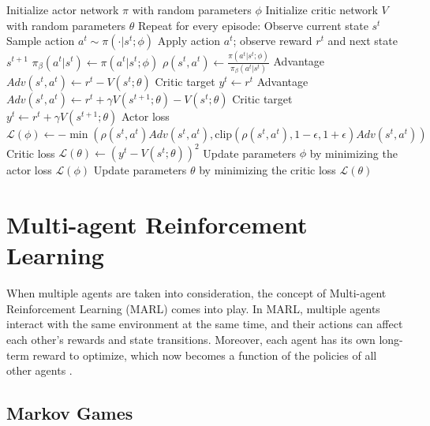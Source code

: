\begin{algorithm}[t]
\caption{PPO}
\label{alg:ppo}
\begin{algorithmic}[1]
\State Initialize actor network $\pi$ with random parameters $\phi$
\State Initialize critic network $V$ with random parameters $\theta$
\State Repeat for every episode:
    \State Observe current state $s^t$
    \State Sample action $a^t \sim \pi(\cdot|s^t;\phi)$
    \State Apply action $a^t$; observe reward $r^t$ and next state $s^{t+1}$
    \State $\pi_{\beta}(a^t|s^t) \gets \pi(a^t|s^t;\phi)$ 
        \State $\rho(s^t,a^t) \gets \frac{\pi(a^t|s^t;\phi)}{\pi_{\beta}(a^t|s^t)}$
            \State Advantage $Adv(s^t,a^t)\gets r^t - V(s^t;\theta)$
            \State Critic target $y^t \gets r^t$
        \Else
            \State Advantage $Adv(s^t,a^t)\gets r^t + \gamma V(s^{t+1};\theta) - V(s^t;\theta)$
            \State Critic target $y^t \gets r^t + \gamma V(s^{t+1};\theta)$
        \EndIf
        \State Actor loss $\mathcal{L}(\phi)\gets -\min \left(\rho(s^t,a^t)Adv(s^t,a^t), \text{clip}(\rho(s^t,a^t),1-\epsilon,1+\epsilon)Adv(s^t,a^t)\right)$
        \State Critic loss $\mathcal{L}(\theta)\gets (y^t - V(s^t;\theta))^2$
        \State Update parameters $\phi$ by minimizing the actor loss $\mathcal{L}(\phi)$
        \State Update parameters $\theta$ by minimizing the critic loss $\mathcal{L}(\theta)$
    \EndFor
\EndFor
\end{algorithmic}
\end{algorithm}

\section{Multi-agent Reinforcement Learning}

When multiple agents are taken into consideration, the concept of Multi-agent Reinforcement Learning (MARL)
comes into play. In MARL, multiple agents interact with the same environment at the same time, and their 
actions can affect each other's rewards and state transitions. Moreover, each agent has its own long-term reward
to optimize, which now becomes a function of the policies of all other agents \cite{zhang2021multi}. 

\subsection{Markov Games}

